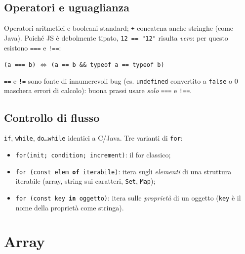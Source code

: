 \subsection{Operatori e uguaglianza}
Operatori aritmetici e booleani standard; \texttt{+} concatena anche stringhe (come Java).
Poich\'e JS \`e debolmente tipato, \texttt{12 == "12"} risulta \emph{vero}: per questo
esistono \texttt{===} e \texttt{!==}:
\begin{center}
\texttt{(a === b)} $\Leftrightarrow$ \texttt{(a == b \&\& typeof a == typeof b)}
\end{center}
\begin{attenzione}
\texttt{==} e \texttt{!=} sono fonte di innumerevoli bug (es. \texttt{undefined} convertito a
\texttt{false} o 0 maschera errori di calcolo): buona prassi usare \emph{solo}
\texttt{===} e \texttt{!==}.
\end{attenzione}

\subsection{Controllo di flusso}
\texttt{if}, \texttt{while}, \texttt{do\dots while} identici a C/Java. Tre varianti di
\texttt{for}:
\begin{itemize}
  \item \texttt{for(init; condition; increment)}: il for classico;
  \item \texttt{for (const elem \textbf{of} iterabile)}: itera sugli \emph{elementi} di una
        struttura iterabile (array, string sui caratteri, \texttt{Set}, \texttt{Map});
  \item \texttt{for (const key \textbf{in} oggetto)}: itera sulle \emph{propriet\`a} di un
        oggetto (\texttt{key} \`e il nome della propriet\`a come stringa).
\end{itemize}

\section{Array}


